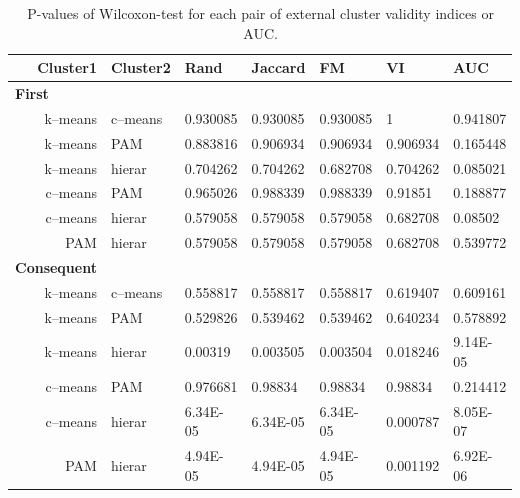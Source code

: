 \begin{table}[!h]
    \small
    \centering
    \caption{P-values of Wilcoxon-test for each pair of external cluster validity indices or AUC.}
    \label{tab:ECVI_Pvalue_Test}
    \begin{tabular}{rllllll} \toprule
        Cluster1  & Cluster2   & Rand        & Jaccard     & FM          & VI          & AUC        \\ \midrule
        \multicolumn{1}{l}{\textbf{First}}       \\        
        k--means       & c--means        & 0.930085   & 0.930085   & 0.930085   & 1           & 0.941807  \\
        k--means       & PAM           & 0.883816   & 0.906934   & 0.906934   & 0.906934    & 0.165448  \\
        k--means       & hierar           & 0.704262   & 0.704262   & 0.682708   & 0.704262    & 0.085021  \\
        c--means       & PAM           & 0.965026   & 0.988339   & 0.988339   & 0.91851     & 0.188877  \\
        c--means       & hierar           & 0.579058   & 0.579058   & 0.579058   & 0.682708    & 0.08502   \\
        PAM          & hierar           & 0.579058   & 0.579058   & 0.579058   & 0.682708    & 0.539772  \\
        \multicolumn{1}{l}{\textbf{Consequent}}\\        
        k--means       & c--means        & 0.558817   & 0.558817   & 0.558817   & 0.619407    & 0.609161  \\
        k--means       & PAM           & 0.529826   & 0.539462   & 0.539462   & 0.640234    & 0.578892  \\
        k--means       & hierar           & 0.00319    & 0.003505   & 0.003504   & 0.018246    & 9.14E-05  \\
        c--means       & PAM           & 0.976681   & 0.98834    & 0.98834    & 0.98834     & 0.214412  \\
        c--means       & hierar          & 6.34E-05   & 6.34E-05   & 6.34E-05   & 0.000787    & 8.05E-07  \\
        PAM          & hierar          & 4.94E-05   & 4.94E-05   & 4.94E-05   & 0.001192    & 6.92E-06  \\
        
        \bottomrule
    \end{tabular}
\end{table}


